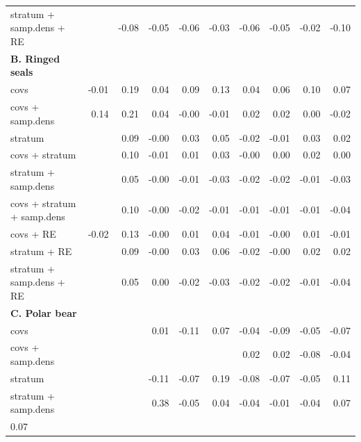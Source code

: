 \documentclass[]{rsos}%
\begin{document}
{\begin{table}[ht]
\begin{tabular}{lrrrrrrrrr}
  stratum + samp.dens + RE &  & -0.08 & -0.05 & -0.06 & -0.03 & -0.06 & -0.05 & -0.02 & -0.10 \\   {\bf B. Ringed seals} & & & & & & & & & \\
  covs & -0.01 & 0.19 & 0.04 & 0.09 & 0.13 & 0.04 & 0.06 & 0.10 & 0.07 \\
  covs + samp.dens & 0.14 & 0.21 & 0.04 & -0.00 & -0.01 & 0.02 & 0.02 & 0.00 & -0.02 \\
  stratum &  & 0.09 & -0.00 & 0.03 & 0.05 & -0.02 & -0.01 & 0.03 & 0.02 \\
  covs + stratum &  & 0.10 & -0.01 & 0.01 & 0.03 & -0.00 & 0.00 & 0.02 & 0.00 \\
  stratum + samp.dens &  & 0.05 & -0.00 & -0.01 & -0.03 & -0.02 & -0.02 & -0.01 & -0.03 \\
  covs + stratum + samp.dens &  & 0.10 & -0.00 & -0.02 & -0.01 & -0.01 & -0.01 & -0.01 & -0.04 \\
  covs + RE & -0.02 & 0.13 & -0.00 & 0.01 & 0.04 & -0.01 & -0.00 & 0.01 & -0.01 \\
  stratum + RE &  & 0.09 & -0.00 & 0.03 & 0.06 & -0.02 & -0.00 & 0.02 & 0.02 \\
  stratum + samp.dens + RE &  & 0.05 & 0.00 & -0.02 & -0.03 & -0.02 & -0.02 & -0.01 & -0.04 \\
  {\bf C. Polar bear} & & & & & & & & & \\
  covs &  &  & 0.01 & -0.11 & 0.07 & -0.04 & -0.09 & -0.05 & -0.07 \\
  covs + samp.dens &  &  &  &  &  & 0.02 & 0.02 & -0.08 & -0.04 \\
  stratum &  &  & -0.11 & -0.07 & 0.19 & -0.08 & -0.07 & -0.05 & 0.11 \\
  stratum + samp.dens &  &  & 0.38 & -0.05 & 0.04 & -0.04 & -0.01 & -0.04 & 0.07 \\
  0.07 \\
   \hline
\end{tabular}
\end{table}

}
\end{document}
